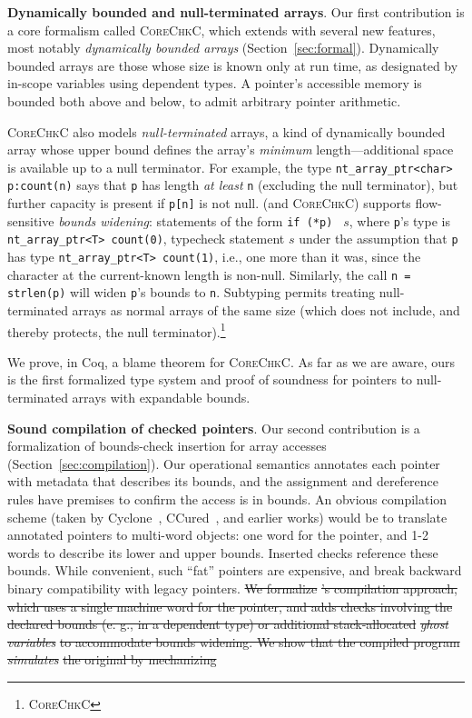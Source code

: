 \documentclass[conference]{IEEEtran}
\newcommand{\myparagraph}[1]{\textbf{#1}.\xspace}
\newcommand{\lang}{\textsc{CoreChkC}\xspace}
\newcommand{\checkedc}{\text{Checked C}\xspace}
\providecommand{\DIFadd}[1]{{\protect\color{blue}\uwave{#1}}} %
\providecommand{\DIFdel}[1]{{\protect\color{red}\sout{#1}}}                      %
\providecommand{\DIFaddbegin}{} %
\providecommand{\DIFaddend}{} %
\providecommand{\DIFdelbegin}{} %
\providecommand{\DIFdelend}{} %
\newcommand{\DIFscaledelfig}{0.5}
\newlength{\DIFdelgraphicswidth} %
\newlength{\DIFdelgraphicsheight} %
\newcommand{\DIFaddincludegraphics}[2][]{{\color{blue}\fbox{\DIFOincludegraphics[#1]{#2}}}} %
\newcommand{\DIFdelincludegraphics}[2][]{%
\sbox{\DIFdelgraphicsbox}{\DIFOincludegraphics[#1]{#2}}%
\settoboxwidth{\DIFdelgraphicswidth}{\DIFdelgraphicsbox} %
\settoboxtotalheight{\DIFdelgraphicsheight}{\DIFdelgraphicsbox} %
\scalebox{\DIFscaledelfig}{%
\parbox[b]{\DIFdelgraphicswidth}{\usebox{\DIFdelgraphicsbox}\\[-\baselineskip] \rule{\DIFdelgraphicswidth}{0em}}\llap{\resizebox{\DIFdelgraphicswidth}{\DIFdelgraphicsheight}{%
\setlength{\unitlength}{\DIFdelgraphicswidth}%
\begin{picture}(1,1)%
\thicklines\linethickness{2pt} %
{\color[rgb]{1,0,0}\put(0,0){\framebox(1,1){}}}%
{\color[rgb]{1,0,0}\put(0,0){\line( 1,1){1}}}%
{\color[rgb]{1,0,0}\put(0,1){\line(1,-1){1}}}%
\end{picture}%
}\hspace*{3pt}}} %
} %
\DeclareRobustCommand{\DIFaddbegin}{\DIFOaddbegin \let\includegraphics\DIFaddincludegraphics} %
\DeclareRobustCommand{\DIFaddend}{\DIFOaddend \let\includegraphics\DIFOincludegraphics} %
\DeclareRobustCommand{\DIFdelbegin}{\DIFOdelbegin \let\includegraphics\DIFdelincludegraphics} %
\DeclareRobustCommand{\DIFdelend}{\DIFOaddend \let\includegraphics\DIFOincludegraphics} %
\begin{document}
\myparagraph{Dynamically bounded and null-terminated arrays}
Our first contribution is a core formalism called \lang, which extends
\citet{ruef18checkedc-incr} with several new features, most notably 
\emph{dynamically bounded arrays} (Section~\ref{sec:formal}). 
Dynamically bounded arrays are those whose size is
known only at run time, as designated by in-scope variables using
dependent types. A pointer's accessible memory is bounded both above
and below, to admit arbitrary pointer arithmetic.

\lang also models
\emph{null-terminated} arrays, a kind of dynamically bounded array
whose upper bound
defines the array's \emph{minimum} length---additional space is available 
up to a null terminator. For example, the \checkedc type
\lstinline{nt_array_ptr<char> p:count(n)} says that
\lstinline{p} has length \emph{at least} \lstinline{n} (excluding the
null terminator), but further capacity is present if \lstinline|p[n]| is not null. \checkedc (and \lang) supports flow-sensitive
\emph{bounds widening}: statements of the form \lstinline|if (*p) | $s$,
where \lstinline{p}'s type is \lstinline{nt_array_ptr<T> count(0)},
typecheck statement $s$ under the assumption that \lstinline{p} has
type \lstinline{nt_array_ptr<T> count(1)}, 
 i.e., one more than it was,
since the character at the current-known length is
non-null. Similarly, the call \lstinline|n = strlen(p)| will widen
\lstinline|p|'s bounds to \lstinline|n|. Subtyping permits treating
null-terminated arrays as normal arrays of the same size (which
does not include, and thereby protects, the null
terminator).\DIFaddbegin \footnote{
    \DIFadd{See Sec.~\ref{sec:related} for a careful comparison of
    }\citet{ruef18checkedc-incr} \DIFadd{and }\lang\DIFadd{.
}}
\DIFaddend 

We prove, in Coq, a blame theorem for \lang.  As far as we are aware,
ours is the first formalized type system and proof of soundness for
pointers to null-terminated arrays with expandable bounds.



\myparagraph{Sound compilation of checked pointers} Our second
contribution is a formalization of bounds-check insertion for array
accesses (Section~\ref{sec:compilation}). Our operational semantics
annotates each pointer with metadata that describes its bounds, and
the assignment and dereference rules have premises to confirm the
access is in bounds. An obvious compilation scheme (taken by
Cyclone~\cite{Jim2002,GrossmanMJHWC02}, CCured~\cite{Necula2005}, and
earlier works) would be to translate annotated pointers to multi-word
objects: one word for the pointer, and 1-2 words to describe its lower
and upper bounds. Inserted checks reference these bounds. While
convenient, such ``fat'' pointers are expensive, and break backward
binary compatibility with legacy pointers.
\DIFdelbegin \DIFdel{We formalize }%
\DIFdel{'s
compilation approach, which uses a single machine word for the
pointer, and
  adds checks involving the declared bounds (e. g.,
  in a
dependent type) or additional stack-allocated }\emph{\DIFdel{ghost variables}}
\DIFdel{to accommodate bounds widening. We show that the compiled program
}\emph{\DIFdel{simulates}} %
\DIFdel{the original by mechanizing }\DIFdelend \DIFaddbegin 
\end{document}
